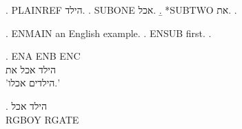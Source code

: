 
\ex. PLAINREF הילד.
\a. SUBONE אכל.
\b. *SUBTWO את.
\z.

\begin{english}
\ex. ENMAIN an English example.
\a. ENSUB first.
\z.

\ex. \gll ENA ENB ENC\\
          הילד אכל את\\
\glt 'הילדים אכלו.'
\end{english}

\ex. \gll *הילד אכל\\
          RGBOY RGATE\\

